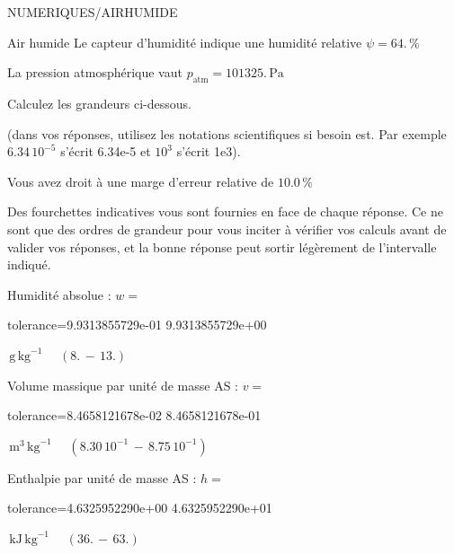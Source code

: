 \documentclass[12pt]{article}
\begin{document}
\begin{quiz}{NUMERIQUES/AIRHUMIDE}
\begin{cloze}{Air humide}
Le capteur d'humidité indique une humidité relative $\psi = 64.\, \% $

La pression atmosphérique vaut $p_{\text{atm}} = 101325.\,  \mathrm{Pa} $

 

Calculez les grandeurs ci-dessous.

(dans vos réponses, utilisez les notations scientifiques si besoin est. Par exemple $6.34\, 10^{-5}$ s'écrit 6.34e-5 et $10^{3}$ s'écrit 1e3).

Vous avez droit à une marge d'erreur relative de $10.0\, \% $

Des fourchettes indicatives vous sont fournies en face de chaque réponse. Ce ne sont que des ordres de grandeur pour vous inciter à vérifier vos calculs avant de valider vos réponses, et la bonne réponse peut sortir légèrement de l'intervalle indiqué.

Humidité absolue : $w =  $
\begin{numerical}[points=1] 
\item[tolerance={9.9313855729e-01}] 9.9313855729e+00 
\end{numerical} 
 $\,  \mathrm{g}\,  \mathrm{kg}^{-1}$ 
 $ \quad (8. \, - \, 13.) $ 

Volume massique par unité de masse AS : $v =  $
\begin{numerical}[points=1] 
\item[tolerance={8.4658121678e-02}] 8.4658121678e-01 
\end{numerical} 
 $\,  \mathrm{m}^{3}\,  \mathrm{kg}^{-1}$ 
 $ \quad ( 8.30 \, 10^{-1}  \, - \,  8.75 \, 10^{-1} ) $ 

Enthalpie par unité de masse AS : $h =  $
\begin{numerical}[points=2] 
\item[tolerance={4.6325952290e+00}] 4.6325952290e+01 
\end{numerical} 
 $\,  \mathrm{kJ}\,  \mathrm{kg}^{-1}$ 
 $ \quad (36. \, - \, 63.) $ 

\end{cloze} 


\end{quiz}
\end{document}
